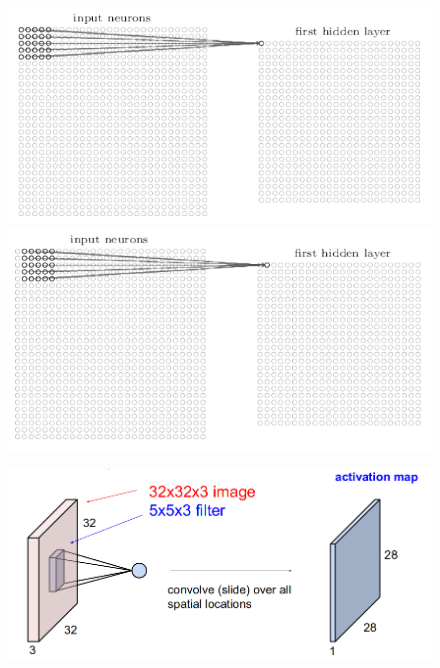 \documentclass[a4paper,12pt]{report}
\numberwithin{equation}{section} %
\begin{document}
\begin{figure}[!ht]
\centering
\vspace{-3mm}
\includegraphics[scale=0.4]{5x5_1.png} \hfill
\includegraphics[scale=0.4]{5x5_2.png} 
\end{figure}

\begin{figure}[!ht]
\centering
\includegraphics[scale=0.35]{conv_act_map.png}
\end{figure}
\end{document}
